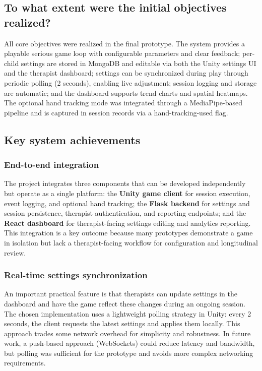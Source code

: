 \documentclass[12pt]{article}
\begin{document}
\subsection{To what extent were the initial objectives realized?}
All core objectives were realized in the final prototype. The system provides a playable serious game loop with configurable parameters and clear feedback; per-child settings are stored in MongoDB and editable via both the Unity settings UI and the therapist dashboard; settings can be synchronized during play through periodic polling (2 seconds), enabling live adjustment; session logging and storage are automatic; and the dashboard supports trend charts and spatial heatmaps. The optional hand tracking mode was integrated through a MediaPipe-based pipeline \cite{ref7} and is captured in session records via a hand-tracking-used flag.

\subsection{Key system achievements}
\subsubsection*{End-to-end integration}
The project integrates three components that can be developed independently but operate as a single platform:
the \textbf{Unity game client} for session execution, event logging, and optional hand tracking; the \textbf{Flask backend} for settings and session persistence, therapist authentication, and reporting endpoints; and the \textbf{React dashboard} for therapist-facing settings editing and analytics reporting.
This integration is a key outcome because many prototypes demonstrate a game in isolation but lack a therapist-facing workflow for configuration and longitudinal review.

\subsubsection*{Real-time settings synchronization}
An important practical feature is that therapists can update settings in the dashboard and have the game reflect these changes during an ongoing session. The chosen implementation uses a lightweight polling strategy in Unity: every 2 seconds, the client requests the latest settings and applies them locally. This approach trades some network overhead for simplicity and robustness. In future work, a push-based approach (WebSockets) could reduce latency and bandwidth, but polling was sufficient for the prototype and avoids more complex networking requirements.
\end{document}
